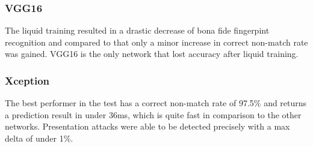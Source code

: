 

\subsubsection{VGG16}
The liquid training resulted in a drastic decrease of bona fide fingerpint recognition and compared to that only a minor increase in correct non-match rate was gained.
VGG16 is the only network that lost accuracy after liquid training.



\subsubsection{Xception}
The best performer in the test has a correct non-match rate of 97.5\% and returns a prediction result in under 36ms, which is quite fast in comparison to the other networks.
Presentation attacks were able to be detected precisely with a max delta of under 1\%.





\endinput





\subsubsection{EfficientNet B0}

The only BPCER over 90\% is achieved by EfficientNet B0 which is the second best performer over all.
Bona fide fingerprints were correctly detected with an accuracy of 92.5\%.

\predictiontables{efficientnet}



\medskip
Out of the three tested neural networks MobileNet was performing the best on average thanks to it's high true negative detection rate.
The other two networks however have a better true positive rate.
\bigskip\hrule



\subsection{MobileNet}
Bona fide fingerprints were correctly detected with an accuracy of 89.1\%, while presentation attacks were detected correctly with 93.19\%.
None of the materials show significant variance from each other and are within a range of 92.0\% and 94.7\%.
Liquid Ecoflex shows the worst deception potential.


